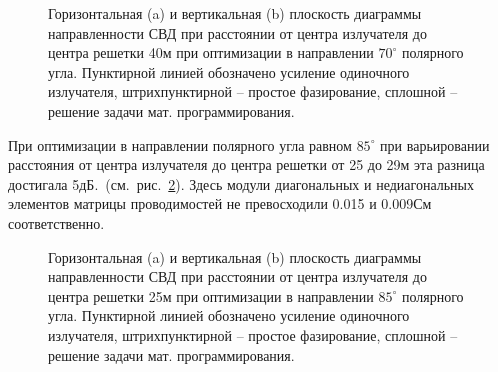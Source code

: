 \begin{figure}
\begin{minipage}[h]{0.49\linewidth}
\end{minipage}
\hfill
\begin{minipage}[h]{0.49\linewidth}
\end{minipage}
\caption{Горизонтальная (a) и вертикальная (b) плоскость диаграммы направленности СВД при расстоянии от центра излучателя до центра решетки 40м при оптимизации в направлении $70^{\circ}$ полярного угла. Пунктирной линией обозначено усиление одиночного излучателя, штрихпунктирной -- простое фазирование, сплошной -- решение задачи мат. программирования.}
\label{ris:svd_mut_5_70_40}
\end{figure}

При оптимизации в направлении полярного угла равном $85^{\circ}$ при варьировании расстояния от центра излучателя до центра решетки от 25 до 29м эта разница достигала 5дБ.~(см.~рис.~\ref{ris:svd_mut_5_85_25}). Здесь модули диагональных и недиагональных элементов матрицы проводимостей не превосходили 0.015 и 0.009См соответственно.

\begin{figure}
\begin{minipage}[h]{0.49\linewidth}
\end{minipage}
\hfill
\begin{minipage}[h]{0.49\linewidth}
\end{minipage}
\caption{Горизонтальная (a) и вертикальная (b) плоскость диаграммы направленности СВД при расстоянии от центра излучателя до центра решетки 25м при оптимизации в направлении $85^{\circ}$ полярного угла. Пунктирной линией обозначено усиление одиночного излучателя, штрихпунктирной -- простое фазирование, сплошной -- решение задачи мат. программирования.}
\label{ris:svd_mut_5_85_25}
\end{figure}

